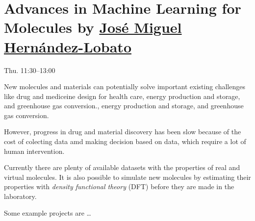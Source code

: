 \chapter{Advances in Machine Learning for Molecules by
  \href{https://jmhl.org/}{José Miguel
Hernández-Lobato}}

Thu. 11:30--13:00

New molecules and materials can potentially solve important existing challenges
like drug and mediceine design for health care, energy production and storage,
and greenhouse gas conversion., energy production and storage, and greenhouse
gas conversion.

However, progress in drug and material discovery has been slow because of the
cost of colecting data amd making decision based on data, which require a lot
of human intervention.

Currently there are plenty of available datasets with the properties of real
and virtual molecules. It is also possible to simulate new molecules by
estimating their properties with \emph{density functional theory} (DFT) before
they are made in the laboratory.

Some example projects are \dots

